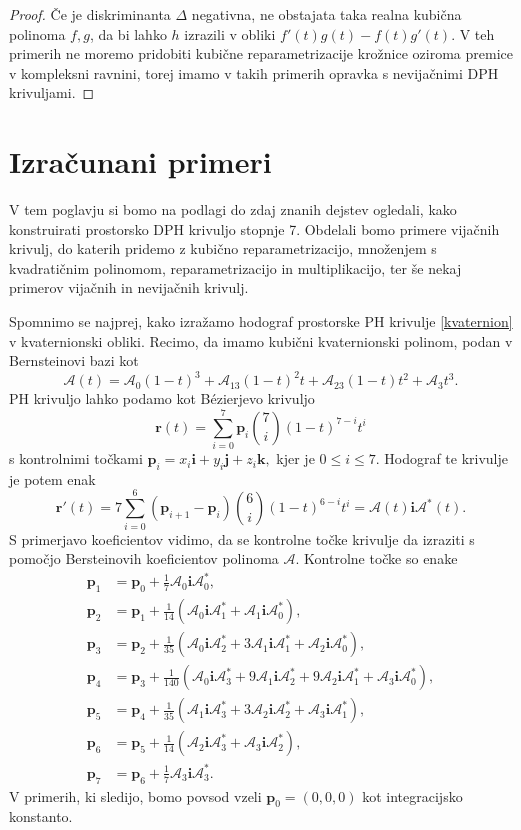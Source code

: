 \documentclass[12pt,a4paper,twoside]{article}
\theoremstyle{definition} %
\theoremstyle{plain} %
\theoremstyle{primerstyle}
\numberwithin{equation}{section}  %
\newcommand{\pV}{\mathbf{p}}
\newcommand{\rV}{\mathbf{r}}
\newcommand{\iV}{\mathbf{i}}
\newcommand{\jV}{\mathbf{j}}
\newcommand{\kV}{\mathbf{k}}
\newcommand{\AQ}{\mathcal{A}}
\begin{document}
\begin{proof}
	Če je diskriminanta $\Delta$ negativna, ne obstajata taka realna kubična polinoma $f,g$, da bi lahko $h$ izrazili v obliki $f'(t)g(t)-f(t)g'(t).$ V teh primerih ne moremo pridobiti kubične reparametrizacije krožnice oziroma premice v kompleksni ravnini, torej imamo v takih primerih opravka s nevijačnimi DPH krivuljami.
\end{proof}


\section{Izračunani primeri}

V tem poglavju si bomo na podlagi do zdaj znanih dejstev ogledali, kako konstruirati prostorsko DPH krivuljo stopnje 7. Obdelali bomo primere vijačnih krivulj, do katerih pridemo z kubično reparametrizacijo, množenjem s kvadratičnim polinomom, reparametrizacijo in multiplikacijo, ter še nekaj primerov vijačnih in nevijačnih krivulj.

Spomnimo se najprej, kako izražamo hodograf prostorske PH krivulje \eqref{kvaternion} v kvaternionski obliki. Recimo, da imamo kubični kvaternionski polinom, podan v Bernsteinovi bazi kot
\begin{equation}
	\AQ(t)=\AQ_0(1-t)^3+\AQ_13(1-t)^2t+\AQ_23(1-t)t^2+\AQ_3t^3.
\end{equation}
PH krivuljo lahko podamo kot Bézierjevo krivuljo
\begin{equation*}
	\rV(t)=\sum_{i=0}^7\pV_i\binom{7}{i}(1-t)^{7-i}t^i
\end{equation*}
s kontrolnimi točkami $\pV_i=x_i\iV+y_i\jV+z_i\kV,$ kjer je $0\leq i\leq 7.$ Hodograf te krivulje je potem enak
\begin{equation*}
	\rV'(t)=7\sum_{i=0}^6(\pV_{i+1}-\pV_i)\binom{6}{i}(1-t)^{6-i}t^i=\AQ(t)\iV\AQ^*(t).
\end{equation*}
S primerjavo koeficientov vidimo, da se kontrolne točke krivulje da izraziti s pomočjo Bersteinovih koeficientov polinoma $\AQ.$ Kontrolne točke so enake
\begin{align}
	\pV_1&=\pV_0+\frac{1}{7}\AQ_0\iV\AQ_0^*,\nonumber\\
	\pV_2&=\pV_1+\frac{1}{14}(\AQ_0\iV\AQ_1^*+\AQ_1\iV\AQ_0^*),\nonumber\\
	\pV_3&=\pV_2+\frac{1}{35}(\AQ_0\iV\AQ_2^*+3\AQ_1\iV\AQ_1^*+\AQ_2\iV\AQ_0^*),\nonumber\\
	\pV_4&=\pV_3+\frac{1}{140}(\AQ_0\iV\AQ_3^*+9\AQ_1\iV\AQ_2^*+9\AQ_2\iV\AQ_1^*+\AQ_3\iV\AQ_0^*),\label{kontrolne_tocke}\\
	\pV_5&=\pV_4+\frac{1}{35}(\AQ_1\iV\AQ_3^*+3\AQ_2\iV\AQ_2^*+\AQ_3\iV\AQ_1^*),\nonumber\\
	\pV_6&=\pV_5+\frac{1}{14}(\AQ_2\iV\AQ_3^*+\AQ_3\iV\AQ_2^*),\nonumber\\
	\pV_7&=\pV_6+\frac{1}{7}\AQ_3\iV\AQ_3^*.\nonumber
\end{align}
V primerih, ki sledijo, bomo povsod vzeli $\pV_0=(0,0,0)$ kot integracijsko konstanto.
\end{document}
